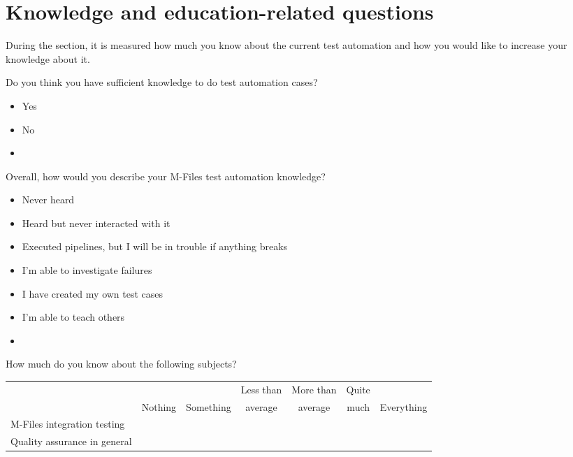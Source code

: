\section*{Knowledge and education-related questions}
During the section, it is measured how much you know about the current test automation and how you would like to increase your knowledge about it.

\begin{question}[resume]
	\item Do you think you have sufficient knowledge to do test automation cases?\greencheckmark\label{survey_question:sufficient_test_automation_knowledge}
	\begin{itemize}[noitemsep, leftmargin=1.5em]
		\renewcommand\labelitemi{\radiobutton}
		\item Yes
		\item No
		\item \othertextfield
	\end{itemize}
	\item Overall, how would you describe your M-Files test automation knowledge?\redcross
	\begin{itemize}[noitemsep, leftmargin=1.5em]
		\renewcommand\labelitemi{\radiobutton}
		\item Never heard
		\item Heard but never interacted with it
		\item Executed pipelines, but I will be in trouble if anything breaks
		\item I'm able to investigate failures
		\item I have created my own test cases
		\item I'm able to teach others
		\item \othertextfield
	\end{itemize}
	\item How much do you know about the following subjects?\redcross
	\begin{center}
		\begin{tabularx}{\textwidth}{X c c c c c c}
			\rowcolor{rgb:white,1} & &  & Less than & More than & Quite & \\
			& Nothing & Something & average & average & much & Everything\\
			M-Files integration testing & \radiobutton & \radiobutton & \radiobutton & \radiobutton & \radiobutton & \radiobutton\\
			Quality assurance in general & \radiobutton & \radiobutton & \radiobutton & \radiobutton & \radiobutton & \radiobutton\\

\end{tabularx}
\end{center}
\end{question}
